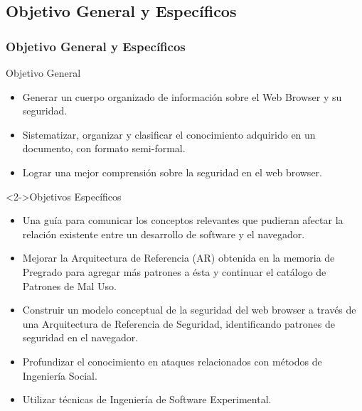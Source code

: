\documentclass[serif,9pt]{beamer}
\begin{document}
\subsection{Objetivo General y Específicos}
\begin{frame}
	\frametitle{Objetivo General y Específicos}
	\begin{block}{Objetivo General}
		\begin{small}
		\begin{itemize}
			\item Generar un cuerpo organizado de informaci\'on sobre el Web Browser y su seguridad.
			\item Sistematizar, organizar y clasificar el conocimiento adquirido en un documento, con formato semi-formal. 
			\item Lograr una mejor comprensión sobre la seguridad en el web browser.
		\end{itemize}
		\end{small}
	\end{block}
	\begin{block}<2->{Objetivos Espec\'ificos}
		\begin{small}
			\begin{itemize}
				\item Una gu\'ia para comunicar los conceptos relevantes que pudieran afectar la relaci\'on existente entre un desarrollo de software y el navegador. 
				\item Mejorar la Arquitectura de Referencia (AR) obtenida en la memoria de Pregrado para agregar más patrones a ésta y continuar el cat\'alogo de Patrones de Mal Uso. 
				\item Construir un modelo conceptual de la seguridad del web browser a través de una Arquitectura de Referencia de Seguridad, identificando patrones de seguridad en el navegador.
				\item Profundizar el conocimiento en ataques relacionados con m\'etodos de Ingenier\'ia Social.
				\item Utilizar técnicas de Ingeniería de Software Experimental.
			\end{itemize}
		\end{small}
	\end{block}
\end{frame}
\end{document}
